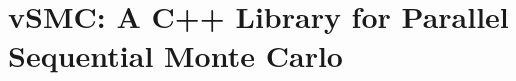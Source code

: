 \chapter{vSMC: A C++ Library for Parallel Sequential Monte Carlo}
\label{cha:vSMC: A C++ Library for Parallel Sequential Monte Carlo}
